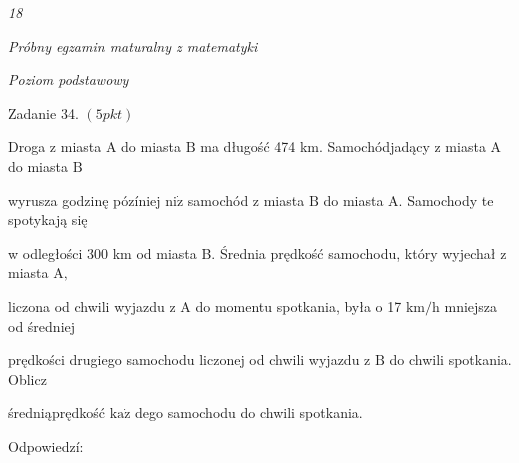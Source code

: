 \documentclass[a4paper,12pt]{article}
\begin{document}
{\it 18}

{\it Próbny egzamin maturalny z matematyki}

{\it Poziom podstawowy}

Zadanie 34. $(5pkt)$

Droga z miasta A do miasta $\mathrm{B}$ ma długość 474 km. Samochódjadący z miasta A do miasta $\mathrm{B}$

wyrusza godzinę pózíniej $\mathrm{n}\mathrm{i}\dot{\mathrm{z}}$ samochód z miasta $\mathrm{B}$ do miasta A. Samochody te spotykają się

w odległości 300 km od miasta B. Średnia prędkość samochodu, który wyjechał z miasta $\mathrm{A},$

liczona od chwili wyjazdu z A do momentu spotkania, była o 17 $\mathrm{k}\mathrm{m}/\mathrm{h}$ mniejsza od średniej

prędkości drugiego samochodu liczonej od chwili wyjazdu z $\mathrm{B}$ do chwili spotkania. Oblicz

średniąprędkość $\mathrm{k}\mathrm{a}\dot{\mathrm{z}}$ dego samochodu do chwili spotkania.

Odpowiedzí:
\end{document}
